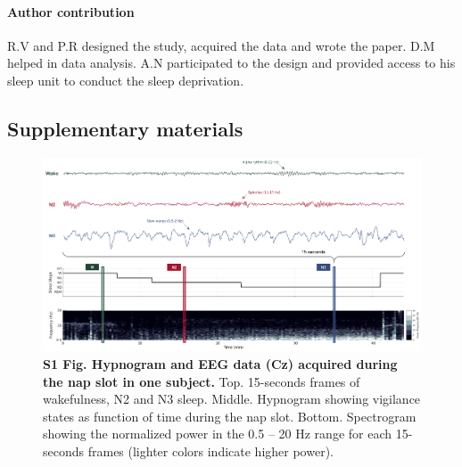 \paragraph{Author contribution}
R.V and P.R designed the study, acquired the data and wrote the paper. D.M helped in data analysis. A.N participated to the design and provided access to his sleep unit to conduct the sleep deprivation.

\subsection*{Supplementary materials}
\label{res:inertia:inertia:supp}

\begin{figure}[htb]
	\includegraphics[width=\textwidth]{Fig/Results/Inertia/Inertia/S1_Scoring.png}
	\caption*{\textbf{S1 Fig. Hypnogram and EEG data (Cz) acquired during the nap slot in one subject.} Top. 15-seconds frames of wakefulness, N2 and N3 sleep. Middle. Hypnogram showing vigilance states as function of time during the nap slot. Bottom. Spectrogram showing the normalized power in the 0.5 – 20 Hz range for each 15-seconds frames (lighter colors indicate higher power).}
\end{figure}

